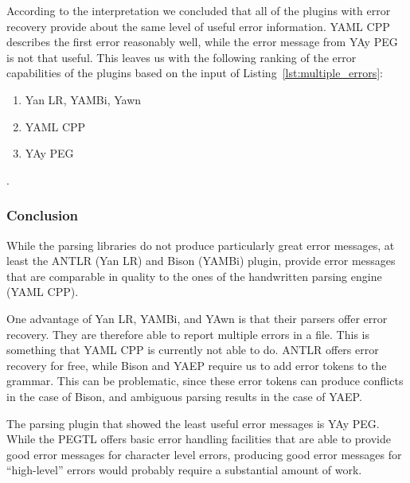 According to the interpretation we concluded that all of the plugins with error recovery provide about the same level of useful error information. YAML CPP describes the first error reasonably well, while the error message from YAy PEG is not that useful. This leaves us with the following ranking of the error capabilities of the plugins based on the input of Listing~\ref{lst:multiple_errors}:

\begin{enumerate}
  \item Yan LR, YAMBi, Yawn
  \item YAML CPP
  \item YAy PEG
\end{enumerate}

.

\subsubsection{Conclusion}

While the parsing libraries do not produce particularly great error messages, at least the ANTLR (Yan LR) and Bison (YAMBi) plugin, provide error messages that are comparable in quality to the ones of the handwritten parsing engine (YAML CPP).

One advantage of Yan LR, YAMBi, and YAwn is that their parsers offer error recovery. They are therefore able to report multiple errors in a file. This is something that YAML CPP is currently not able to do. ANTLR offers error recovery for free, while Bison and YAEP require us to add error tokens to the grammar. This can be problematic, since these error tokens can produce conflicts in the case of Bison, and ambiguous parsing results in the case of YAEP.

The parsing plugin that showed the least useful error messages is YAy PEG. While the PEGTL offers basic error handling facilities that are able to provide good error messages for character level errors, producing good error messages for “high-level” errors would probably require a substantial amount of work.
